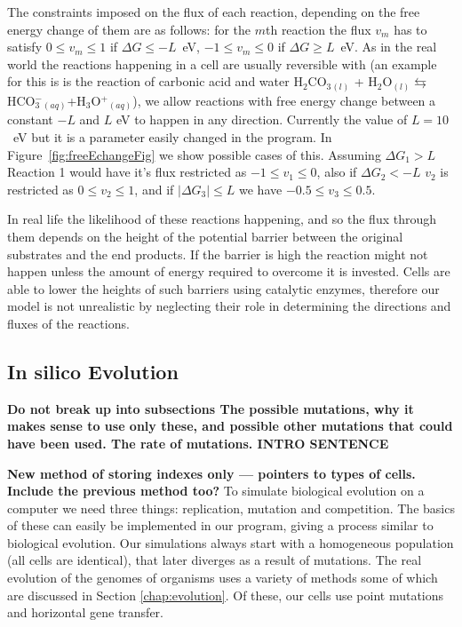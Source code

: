 \documentclass[10pt,a4paper]{article}
\begin{document}
	The constraints imposed on the flux of each reaction, depending on the free energy change of them are as follows: for the $m$th reaction the flux $v_m$ has to satisfy $0\leq v_m \leq 1 $ if $\Delta G \leq -L$~eV, $-1\leq v_m \leq 0 $ if $\Delta G \geq L$~eV. As in the real world the reactions happening in a cell are usually reversible with (an example for this is is the reaction of carbonic acid and water H$_2$CO$_3$$_{(l)}$ + H$_2$O$_{(l)} \leftrightarrows$ HCO$^-_3$$_{(aq)}$+H$_3$O$^+$$_{(aq)}$), we allow reactions with free energy change between a constant $-L$ and $L$ eV to happen in any direction. Currently the value of $L=10$~eV but it is a parameter easily changed in the program. In Figure~\ref{fig:freeEchangeFig} we show possible cases of this. Assuming $\Delta G_1 > L$ Reaction 1 would have it's flux restricted as $-1\leq v_1 \leq 0$, also if $\Delta G_2 < -L$ $v_2$ is restricted as $0 \leq v_2 \leq 1$, and if $|\Delta G_3 | \leq L$ we have $-0.5 \leq v_3 \leq 0.5$. 

	In real life the likelihood of these reactions happening, and so the flux through them depends on the height of the potential barrier between the original substrates and the end products. If the barrier is high the reaction might not happen unless the amount of energy required to overcome it is invested. Cells are able to lower the heights of such barriers using catalytic enzymes, therefore our model is not unrealistic by neglecting their role in determining the directions and fluxes of the reactions. 

\subsection{In silico Evolution}
\label{sub:implementing evolution}
\textbf{
Do not break up into subsections
The possible mutations, why it makes sense to use only these, and possible other mutations that could have been used. The rate of mutations. 
INTRO SENTENCE}

\textbf{New method of storing indexes only --- pointers to types of cells. Include the previous method too?}
To simulate biological evolution on a computer we need three things: replication, mutation and competition. The basics of these can easily be implemented in our program, giving a process similar to biological evolution. Our simulations always start with a homogeneous population (all cells are identical), that later diverges as a result of mutations. The real evolution of the genomes of organisms uses a variety of methods some of which are discussed in Section \ref{chap:evolution}. Of these, our cells use point mutations and horizontal gene transfer.
	
\end{document}
